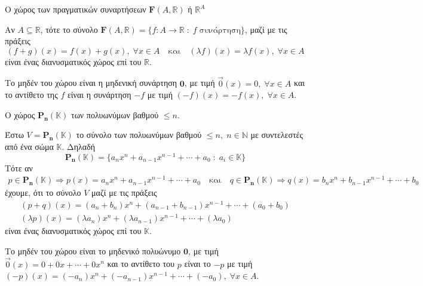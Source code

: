 \begin{example}\label{ex:funs} 
    \textcolor{Col2}{Ο χώρος των πραγματικών συναρτήσεων 
    $\mathbf{F}(A, \mathbb{R})$ ή $\mathbb{R} ^{A}$}

    Αν $ A \subseteq \mathbb{R} $, τότε το σύνολο 
    $ \mathbf{F}{(A, \mathbb{R})} = 
    \{ f \colon A \to \mathbb{R} \; : \; f \; \text{συνάρτηση} \} $, μαζί με 
    τις πράξεις
    \[
        (f+g)(x) = f(x) +g(x), \; \forall x \in A \quad \text{και} 
        \quad (\lambda f)(x)= \lambda f(x), \; \forall x \in A
    \] 
    είναι ένας διανυσματικός χώρος επί του $ \mathbb{R} $.

    Το μηδέν του χώρου είναι η μηδενική συνάρτηση $ \mathbf{0} $, με τιμή 
    $ \vec{0}(x)=0, \; \forall x \in A $ και το αντίθετο της $f$ είναι 
    η συνάρτηση $ -f $ με τιμή $ (-f)(x) = - f(x), \; \forall x \in A $.
\end{example}

\begin{example}
    \textcolor{Col2}{Ο χώρος $\mathbf{P_{n}(\mathbb{K})}$ των 
    πολυωνύμων βαθμού $ \leq n $}.

    Έστω $ V = \mathbf{P_{n}}(\mathbb{K}) $ το σύνολο των πολυωνύμων βαθμού 
    $ \leq n, \; n \in \mathbb{N}  $ με συντελεστές από ένα σώμα 
    $ \mathbb{K} $. Δηλαδή 
    \[
        \mathbf{P_{n}}(\mathbb{K}) = \{ a_{n}x^{n}+a_{n-1}x^{n-1}+\cdots +
        a_{0} \; : \; a_{i} \in \mathbb{K} \}  
    \]
    Τότε αν 
    \begin{gather*}
        p \in \mathbf{P_{n}}(\mathbb{K}) \Rightarrow p(x)
        = a_{n}x^{n}+a_{n-1}x^{n-1}+\cdots + a_{0} \quad \text{και} 
        \quad q \in \mathbf{P_{n}}(\mathbb{K}) \Rightarrow 
        q(x) = b_{n}x^{n}+b_{n-1}x^{n-1}+\cdots + b_{0} 
    \end{gather*} 
    έχουμε, ότι το σύνολο $ V $ μαζί με τις πράξεις 
    \begin{gather*}
        (p+q)(x) = (a_{n}+ b_{n})x^{n} + 
        (a_{n-1}+b_{n-1})x^{n-1}+ \cdots + (a_{0}+ b_{0}) \\
        (\lambda p)(x) = (\lambda a_{n})x^{n}+
        ( \lambda a_{n-1})x^{n-1}+ \cdots + ( \lambda a_{0})
    \end{gather*} 
    είναι ένας διανυσματικός χώρος επί του $ \mathbb{K} $.

    Το μηδέν του χώρου είναι το μηδενικό πολυώνυμο $ \mathbf{0} $, 
    με τιμή $ \vec{0}(x)=0+0x+\cdots +0x^{n} $ και το αντίθετο του 
    $p$ είναι το $ - p $ με τιμή $ (- p)(x) = 
    (-a_{n})x^{n}+(-a_{n-1})x^{n-1}+\cdots + (-a_{0}), \; \forall x \in A $.  
\end{example}


